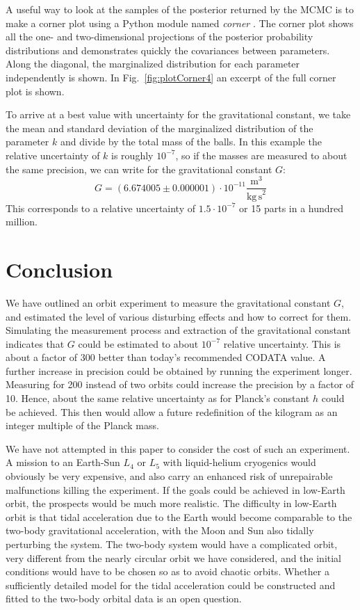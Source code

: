 \documentclass[]{rsos}
\begin{document}
A useful way to look at the samples of the posterior returned by the MCMC is to make a corner plot using a Python module named \textit{corner} \citep{corner}. The corner plot shows all the one- and two-dimensional projections of the posterior probability distributions and demonstrates quickly the covariances between parameters. Along the diagonal, the marginalized distribution for each parameter independently is shown.
In Fig.~\ref{fig:plotCorner4} an excerpt of the full corner plot is shown. 

To arrive at a best value with uncertainty for the gravitational constant, we take the mean and standard deviation of the marginalized distribution of the parameter $k$ and divide by the total mass of the balls. In this example the relative uncertainty of $k$ is roughly $10^{-7}$, so if the masses are measured to about the same precision, we can write for the gravitational constant $G$:
\begin{equation}\label{Gfit}
G = \left(6.674005 \pm 0.000001 \right) \cdot 10^{-11}  \frac{\mathrm{m}^3}{\mathrm{kg \, s}^2}
\end{equation}
This corresponds to a relative uncertainty of $1.5 \cdot 10^{-7}$ or 15 parts in a hundred million.

\section{Conclusion}
We have outlined an orbit experiment to measure the gravitational
constant $G$, and estimated the level of various disturbing effects
and how to correct for them.  Simulating the measurement process and
extraction of the gravitational constant indicates that $G$ could be
estimated to about $10^{-7}$ relative uncertainty.  This is about a
factor of 300 better than today's recommended CODATA value. A further increase in precision could be obtained by running the experiment longer. Measuring for 200 instead of two orbits could increase the precision by a factor of 10.
Hence, about the same relative uncertainty as for Planck's constant
$h$ \citep[$1.2 \cdot 10^{-8}$][]{CODATA17} could be achieved. This then
would allow a future redefinition of the kilogram as an integer
multiple of the Planck mass.

We have not attempted in this paper to consider the cost of such an
experiment.  A mission to an Earth-Sun $L_4$ or $L_5$ with
liquid-helium cryogenics would obviously be very expensive, and also
carry an enhanced risk of unrepairable malfunctions killing the
experiment.  If the goals could be achieved in low-Earth orbit, the
prospects would be much more realistic.  The difficulty in low-Earth
orbit is that tidal acceleration due to the Earth would become
comparable to the two-body gravitational acceleration, with the Moon
and Sun also tidally perturbing the system.  The two-body system would
have a complicated orbit, very different from the nearly circular
orbit we have considered, and the initial conditions would have to be
chosen so as to avoid chaotic orbits.  Whether a sufficiently detailed
model for the tidal acceleration could be constructed and fitted to
the two-body orbital data is an open question.

\def\nat{Nature}
\def\prd{PRD}



\end{document}
